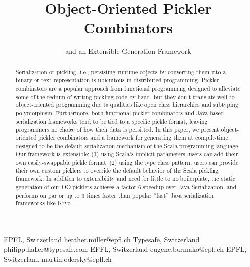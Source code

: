 \documentclass[preprint,10pt]{sigplanconf}
\theoremstyle{definition}
\theoremstyle{definition}
\newcommand{\todo}{{\bf \colorbox{red}{\color{white}TODO:}}}
\begin{document}
\setmainfont[Mapping=tex-text]{Times New Roman}
\setmonofont[Scale=0.8,BoldFont={Consolas Bold}]{Consolas}

\copyrightdata{[to be supplied]}


\title{Object-Oriented Pickler Combinators}
\subtitle{and an Extensible Generation Framework}

           {EPFL, Switzerland}
           {heather.miller@epfl.ch}
           {Typesafe, Switzerland}
           {philipp.haller@typesafe.com}
           {EPFL, Switzerland}
           {eugene.burmako@epfl.ch}
           {EPFL, Switzerland}
           {martin.odersky@epfl.ch}

\maketitle

\begin{abstract}

Serialization or pickling, i.e., persisting runtime objects by converting them
into a binary or text representation is ubiquitous in distributed programming.
Pickler combinators are a popular approach from functional programming designed to
alleviate some of the tedium of writing pickling code by hand, but they don't
translate well to object-oriented programming due to qualities like open class
hierarchies and subtyping polymorphism. Furthermore, both functional pickler
combinators and Java-based serialization frameworks tend to be tied to a
specific pickle format, leaving programmers no choice of how their data is
persisted. In this paper, we present object-oriented pickler combinators and a
framework for generating them at compile-time, designed to be the default
serialization mechanism of the Scala programming language. Our framework is
extensible; (1) using Scala's implicit parameters, users can add their own
easily-swappable pickle format, (2) using the type class pattern, users can
provide their own custom picklers to override the default behavior of the
Scala pickling framework. In addition to extensibility and need for little to
no boilerplate, the static generation of our OO picklers achieves a factor 6
speedup over Java Serialization, and performs on par or up to 3 times faster
than popular ``fast'' Java serialization frameworks like Kryo.

\end{abstract}
\end{document}
